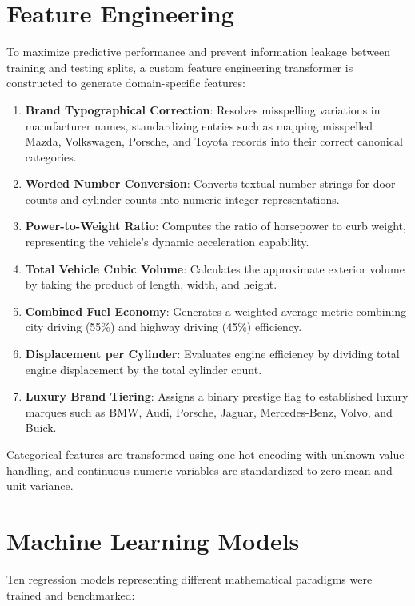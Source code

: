\documentclass[conference]{IEEEtran}
\begin{document}
\section{Feature Engineering}
To maximize predictive performance and prevent information leakage between training and testing splits, a custom feature engineering transformer is constructed to generate domain-specific features:

\begin{enumerate}
    \item \textbf{Brand Typographical Correction}: Resolves misspelling variations in manufacturer names, standardizing entries such as mapping misspelled Mazda, Volkswagen, Porsche, and Toyota records into their correct canonical categories.
    \item \textbf{Worded Number Conversion}: Converts textual number strings for door counts and cylinder counts into numeric integer representations.
    \item \textbf{Power-to-Weight Ratio}: Computes the ratio of horsepower to curb weight, representing the vehicle's dynamic acceleration capability.
    \item \textbf{Total Vehicle Cubic Volume}: Calculates the approximate exterior volume by taking the product of length, width, and height.
    \item \textbf{Combined Fuel Economy}: Generates a weighted average metric combining city driving (55\%) and highway driving (45\%) efficiency.
    \item \textbf{Displacement per Cylinder}: Evaluates engine efficiency by dividing total engine displacement by the total cylinder count.
    \item \textbf{Luxury Brand Tiering}: Assigns a binary prestige flag to established luxury marques such as BMW, Audi, Porsche, Jaguar, Mercedes-Benz, Volvo, and Buick.
\end{enumerate}

Categorical features are transformed using one-hot encoding with unknown value handling, and continuous numeric variables are standardized to zero mean and unit variance.

\section{Machine Learning Models}
Ten regression models representing different mathematical paradigms were trained and benchmarked:
\end{document}
